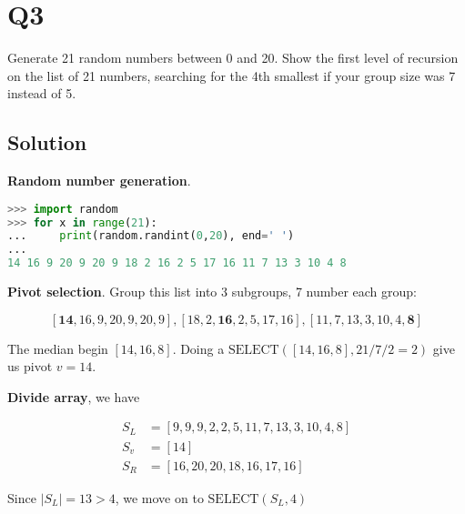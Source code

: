 
\section*{Q3}

Generate 21 random numbers between 0 and 20.
Show the first level of recursion on the list of 21 numbers, searching for the 4th smallest if your group size was 7 instead of 5.

\subsection*{Solution}

\textbf{Random number generation}.
\begin{lstlisting}[language=python]
>>> import random
>>> for x in range(21):
...     print(random.randint(0,20), end=' ')
... 
14 16 9 20 9 20 9 18 2 16 2 5 17 16 11 7 13 3 10 4 8
\end{lstlisting}

\textbf{Pivot selection}. Group this list into 3 subgroups, 7 number each group:

$$[\mathbf{14}, 16, 9, 20, 9, 20, 9], [18, 2, \mathbf{16}, 2, 5, 17, 16], [11, 7, 13, 3, 10, 4, \mathbf{8}]$$

The median begin $[14, 16, 8]$.
Doing a $\text{SELECT}([14, 16, 8], 21/7/2 = 2)$ give us pivot $v = 14$.

\textbf{Divide array}, we have

\begin{align*}
    S_L & = [9, 9, 9, 2, 2, 5, 11, 7, 13, 3, 10, 4, 8] \\
    S_v & = [14]                                       \\
    S_R & = [16, 20, 20, 18, 16, 17, 16]
\end{align*}

Since $|S_L| = 13 > 4$, we move on to $\text{SELECT}(S_L, 4)$

